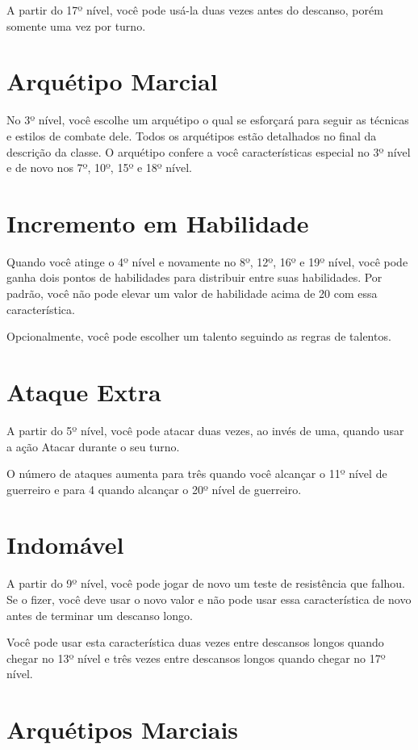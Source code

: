 \documentclass{RPG_Adventure}[2021/10/20]
\begin{document}
A partir do 17º nível, você pode usá-la duas vezes antes do descanso, porém
somente uma vez por turno.

\section*{Arquétipo Marcial}%

No 3º nível, você escolhe um arquétipo o qual se esforçará para seguir as
técnicas e estilos de combate dele. Todos os arquétipos estão detalhados no
final da descrição da classe. O arquétipo confere a você características
especial no 3º nível e de novo nos 7º, 10º, 15º e 18º nível.

\section*{Incremento em Habilidade}%

Quando você atinge o 4º nível e novamente no 8º, 12º, 16º e 19º nível, você pode
ganha dois pontos de habilidades para distribuir entre suas habilidades. Por
padrão, você não pode elevar um valor de habilidade acima de 20 com essa
característica.

Opcionalmente, você pode escolher um talento seguindo as regras de talentos.

\section*{Ataque Extra}%

A partir do 5º nível, você pode atacar duas vezes, ao invés de uma, quando usar
a ação Atacar durante o seu turno.

O número de ataques aumenta para três quando você alcançar o 11º nível de
guerreiro e para 4 quando alcançar o 20º nível de guerreiro.

\section*{Indomável}%

A partir do 9º nível, você pode jogar de novo um teste de resistência que
falhou. Se o fizer, você deve usar o novo valor e não pode usar essa
característica de novo antes de terminar um descanso longo.

Você pode usar esta característica duas vezes entre descansos longos quando
chegar no 13º nível e três vezes entre descansos longos quando chegar no 17º
nível.

\section*{Arquétipos Marciais}%
\end{document}
